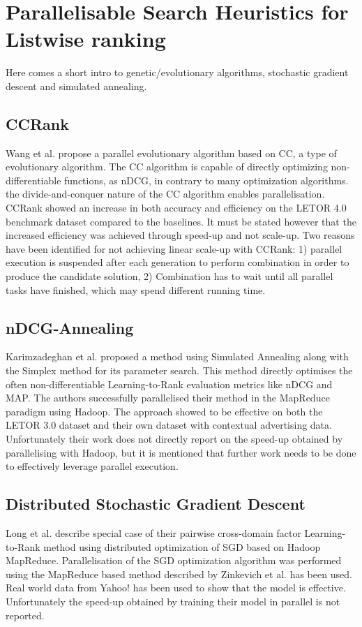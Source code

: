 \section{Parallelisable Search Heuristics for Listwise ranking}
Here comes a short intro to genetic/evolutionary algorithms, stochastic gradient descent and simulated annealing.
\subsection{CCRank}
Wang et al. \cite{Wang2011a,Wang2011b} propose a parallel evolutionary algorithm based on \ac{CC}, a type of evolutionary algorithm. The \ac{CC} algorithm is capable of directly optimizing non-differentiable functions, as \ac{nDCG}, in contrary to many optimization algorithms.  the divide-and-conquer nature of the \ac{CC} algorithm enables parallelisation. CCRank showed an increase in both accuracy and efficiency on the LETOR 4.0 benchmark dataset compared to the baselines. It must be stated however that the increased efficiency was achieved through speed-up and not scale-up. Two reasons have been identified for not achieving linear scale-up with CCRank: 1) parallel execution is suspended after each generation to perform combination in order to produce the candidate solution, 2) Combination has to wait until all parallel tasks have finished, which may spend different running time.
\subsection{nDCG-Annealing}
Karimzadeghan et al. \cite{Karimzadehgan2011} proposed a method using Simulated Annealing along with the Simplex method for its parameter search. This method directly optimises the often non-differentiable Learning-to-Rank evaluation metrics like \ac{nDCG} and \ac{MAP}. The authors successfully parallelised their method in the MapReduce paradigm using Hadoop. The approach showed to be effective on both the LETOR 3.0 dataset and their own dataset with contextual advertising data. Unfortunately their work does not directly report on the speed-up obtained by parallelising  with Hadoop, but it is mentioned that further work needs to be done to effectively leverage parallel execution.
\subsection{Distributed Stochastic Gradient Descent}
Long et al. \cite{Long2012} describe special case of their pairwise cross-domain factor Learning-to-Rank method using distributed optimization of \ac{SGD} based on Hadoop MapReduce. Parallelisation of the \ac{SGD} optimization algorithm was performed using the MapReduce based method described by  Zinkevich et al. \cite{Zinkevich2010} has been used. Real world data from Yahoo! has been used to show that the model is effective. Unfortunately the speed-up obtained by training their model in parallel is not reported.\\

